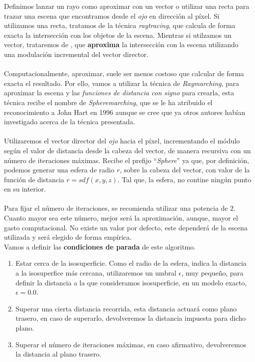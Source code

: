Definimos lanzar un rayo como aproximar con un vector o utilizar una recta para trazar una escena que encontramos desde el \textit{ojo} en dirección al píxel. Si utilizamos una recta, tratamos de la técnica \textit{raytracing}, que calcula de forma exacta la intersección con los objetos de la escena. Mientras si utilzamos un vector, trataremos de , que \textbf{aproxima} la intersección con la escena utilizando una modulación incremental del vector director.\\\\
Computacionalmente, aproximar, suele ser menos costoso que calcular de forma exacta el resultado. Por ello, vamos a utilizar la técnica de \textit{Raymarching}, para aproximar la escena y las \textit{funciones de distancia con signo} para crearla, esta técnica recibe el nombre de \textit{Spheremarching}, que se le ha atribuido el reconocimiento a John Hart en 1996 aunque  se cree que ya otros autores habían investigado acerca de la técnica presentada. \\\\
Utilizaremos el vector director del \textit{ojo} hacia el píxel, incrementando el módulo según el valor de distancia desde la cabeza del vector, de manera recursiva con un número de iteraciones máximas. Recibe el prefijo \enquote{\textit{Sphere}\textendash} ya que, por definición, podemos generar una esfera de radio \(r\), sobre la cabeza del vector, con valor de la función de distancia \(r=sdf(x,y,z)\). Tal que, la esfera, no contine ningún punto en su interior.\\\\
Para fijar el número de iteraciones, se recomienda utilizar una potencia de \(2\). Cuanto mayor sea este número, mejor será la aproximación, aunque, mayor el gasto computacional. No existe un valor por defecto, este dependerá de la escena utilizada y será elegido de forma empírica.\\
Vamos a definir las \textbf{condiciones de parada} de este algoritmo.
\begin{enumerate}
    \item Estar cerca de la isosuperficie. Como el radio de la esfera, indica la distancia a la isosuperfice más cercana, utilizaremos un umbral \(\epsilon\), muy pequeño, para definir la distancia a la que consideramos isosuperficie, en un modelo exacto, \(\epsilon=0.0\).
    \item Superar una cierta distancia recorrida, esta distancia actuará como plano trasero, en caso de superarlo, devolveremos la distancia impuesta para dicho plano. 
    \item Superar el número de iteraciones máximas, en caso afirmativo, devolveremos la distancia al plano trasero.
\end{enumerate}
